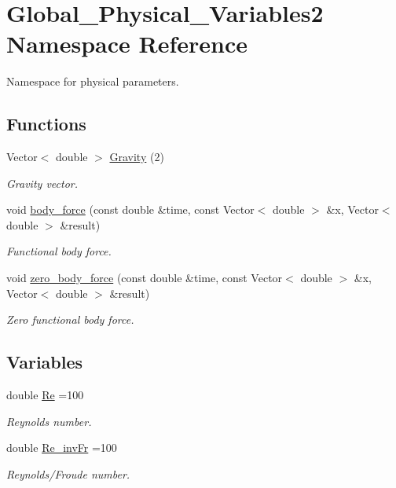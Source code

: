 \hypertarget{namespaceGlobal__Physical__Variables2}{}\section{Global\+\_\+\+Physical\+\_\+\+Variables2 Namespace Reference}
\label{namespaceGlobal__Physical__Variables2}


Namespace for physical parameters.  


\subsection*{Functions}
\begin{DoxyCompactItemize}
\item 
Vector$<$ double $>$ \hyperlink{namespaceGlobal__Physical__Variables2_a302cf0e32c91f4d73a96cca3db4525bb}{Gravity} (2)
\begin{DoxyCompactList}\small\item\em Gravity vector. \end{DoxyCompactList}\item 
void \hyperlink{namespaceGlobal__Physical__Variables2_a81f723c56b35c14482cc516f0bfce3cd}{body\+\_\+force} (const double \&time, const Vector$<$ double $>$ \&x, Vector$<$ double $>$ \&result)
\begin{DoxyCompactList}\small\item\em Functional body force. \end{DoxyCompactList}\item 
void \hyperlink{namespaceGlobal__Physical__Variables2_a3820ea1a672c3e2709095fc366e40ca7}{zero\+\_\+body\+\_\+force} (const double \&time, const Vector$<$ double $>$ \&x, Vector$<$ double $>$ \&result)
\begin{DoxyCompactList}\small\item\em Zero functional body force. \end{DoxyCompactList}\end{DoxyCompactItemize}
\subsection*{Variables}
\begin{DoxyCompactItemize}
\item 
double \hyperlink{namespaceGlobal__Physical__Variables2_afce617c1bd6726b29fa0e1f7c892a955}{Re} =100
\begin{DoxyCompactList}\small\item\em Reynolds number. \end{DoxyCompactList}\item 
double \hyperlink{namespaceGlobal__Physical__Variables2_a29c665c13064cdd6ecbb6c6ab654f743}{Re\+\_\+inv\+Fr} =100
\begin{DoxyCompactList}\small\item\em Reynolds/\+Froude number. \end{DoxyCompactList}\end{DoxyCompactItemize}


